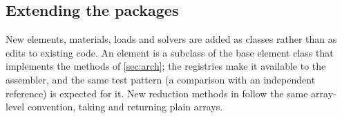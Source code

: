 \subsection{Extending the packages}
New elements, materials, loads and solvers are added as classes rather than as edits to existing code. An element is a subclass of the base element class that implements the methods of \cref{sec:arch}; the registries make it available to the assembler, and the same test pattern (a comparison with an independent reference) is expected for it.
New reduction methods in \rom{} follow the same array-level convention, taking and returning plain arrays.
